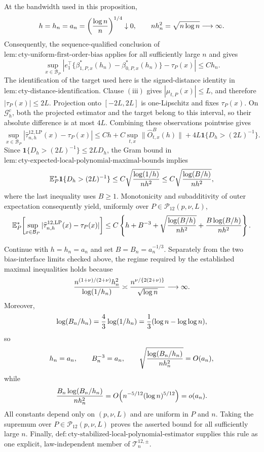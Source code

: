 At the bandwidth used in this proposition,
\[
 h=h_n=a_n=\left({\log n\over n}\right)^{1/4}\downarrow0,
 \qquad
 nh_n^2=\sqrt{n\log n}\longrightarrow\infty.
\]
Consequently, the sequence-qualified conclusion of \(\mathrm{lem:cty\text{-}uniform\text{-}first\text{-}order\text{-}bias}\) applies for all sufficiently large \(n\) and gives
\[
 \sup_{x\in\mathcal B_P}\left|
 e_1^\top\{\beta^*_{1,P,x}(h_n)-\beta^*_{0,P,x}(h_n)\}-\tau_P(x)
 \right|\leq Ch_n.
\]
The identification of the target used here is the signed-distance identity in \(\mathrm{lem:cty\text{-}distance\text{-}identification}\).  Clause \(\mathrm{(iii)}\) gives \(|\mu_{t,P}(x)|\leq L\), and therefore \(|\tau_P(x)|\leq2L\).  Projection onto \([-2L,2L]\) is one-Lipschitz and fixes \(\tau_P(x)\).  On \(\mathcal G_h^c\), both the projected estimator and the target belong to this interval, so their absolute difference is at most \(4L\).  Combining these observations pointwise gives
\[
 \sup_{x\in\mathcal B_P}
 |\widehat\tau^{12,\mathrm{LP}}_{n,h}(x)-\tau_P(x)|
 \leq Ch+C\sup_{t,x}\lVert\widehat O^B_{t,x}(h)\rVert
 +4L\mathbf1\{D_h>(2L)^{-1}\}.
\]
Since \(\mathbf1\{D_h>(2L)^{-1}\}\leq2LD_h\), the Gram bound in \(\mathrm{lem:cty\text{-}expected\text{-}local\text{-}polynomial\text{-}maximal\text{-}bounds}\) implies
\[
 \mathbb E_P^*\mathbf1\{D_h>(2L)^{-1}\}
 \leq C\sqrt{{\log(1/h)\over nh^2}}
 \leq C\sqrt{{\log(B/h)\over nh^2}},
\]
where the last inequality uses \(B\geq1\).  Monotonicity and subadditivity of outer expectation consequently yield, uniformly over \(P\in\mathcal P_{12}(p,\nu,L)\),
\[
 \mathbb E_P^*\!\left[
 \sup_{x\in\mathcal B_P}
 |\widehat\tau^{12,\mathrm{LP}}_{n,h}(x)-\tau_P(x)|
 \right]
 \leq C\left\{h+B^{-3}+\sqrt{{\log(B/h)\over nh^2}}
 +{B\log(B/h)\over nh^2}\right\}.
\]

Continue with \(h=h_n=a_n\) and set \(B=B_n=a_n^{-1/3}\).  Separately from the two bias-interface limits checked above, the regime required by the established maximal inequalities holds because
\[
 {n^{(1+\nu)/(2+\nu)}h_n^2\over\log(1/h_n)}
 \asymp {n^{\nu/\{2(2+\nu)\}}\over\sqrt{\log n}}
 \longrightarrow\infty.
\]
Moreover,
\[
 \log(B_n/h_n)={4\over3}\log(1/h_n)
 ={1\over3}(\log n-\log\log n),
\]
so
\[
 h_n=a_n,\qquad B_n^{-3}=a_n,
 \qquad \sqrt{{\log(B_n/h_n)\over nh_n^2}}=O(a_n),
\]
while
\[
 {B_n\log(B_n/h_n)\over nh_n^2}
 =O\!\left(n^{-5/12}(\log n)^{5/12}\right)=o(a_n).
\]
All constants depend only on \((p,\nu,L)\) and are uniform in \(P\) and \(n\).  Taking the supremum over \(P\in\mathcal P_{12}(p,\nu,L)\) proves the asserted bound for all sufficiently large \(n\).  Finally, \(\mathrm{def:cty\text{-}stabilized\text{-}local\text{-}polynomial\text{-}estimator}\) supplies this rule as one explicit, law-independent member of \(\mathcal T_n^{12,\pm}\).
